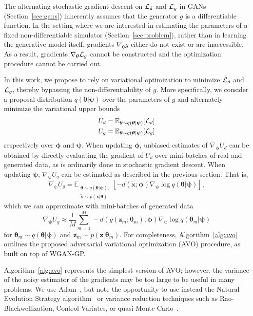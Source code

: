 \documentclass[twocolumn,superscriptaddress,aps]{revtex4-1}
\newcommand{\bftheta}{{\bm \theta}}
\newcommand{\bfpsi}{{\bm \psi}}
\newcommand{\bfphi}{{\bm \phi}}
\newcommand{\bfx}{\mathbf{x}}
\newcommand{\bfz}{\mathbf{z}}
\theoremstyle{plain}
\begin{document}
The alternating stochastic gradient descent on ${\cal L}_d$ and ${\cal L}_g$ in
GANs (Section~\ref{sec:gans}) inherently assumes that the generator $g$ is a differentiable function. In
the setting where we are interested in estimating the parameters of a
fixed non-differentiable simulator (Section~\ref{sec:problem}),
rather than in learning the generative model itself,
gradients $\nabla_\bftheta g$ either do not exist or are inaccessible. As a
result, gradients $\nabla_\bftheta {\cal L}_g$ cannot be constructed and the
optimization procedure cannot be carried out.

In this work, we propose to rely on variational optimization to minimize ${\cal
L}_d$ and ${\cal L}_g$, thereby bypassing the non-differentiability of $g$. More
specifically, we consider a proposal distribution $q(\bftheta|\bfpsi)$ over the
parameters of $g$ and alternately minimize the variational upper bounds
\begin{align}
    U_d &= \mathbb{E}_{\bftheta \sim q(\bftheta|\bfpsi)} [ {\cal L}_d ] \label{eqn:vo-ud} \\
    U_g &= \mathbb{E}_{\bftheta \sim q(\bftheta|\bfpsi)} [ {\cal L}_g ] \label{eqn:vo-ug}
\end{align} respectively over $\bfphi$ and $\bfpsi$.
When updating
$\bfphi$, unbiased estimates of $\nabla_\bfphi U_d$ can be obtained by
directly evaluating the gradient of $U_d$ over mini-batches of real and
generated data, as is ordinarily done in stochastic gradient descent. When updating
$\bfpsi$, $\nabla_\bfpsi U_g$ can be estimated as described in the previous section.
That is,
\begin{equation}\label{eqn:grad-ug-approx}
   \nabla_\bfpsi U_g = \mathbb{E}_{\substack{\bftheta \sim q(\bftheta|\bfpsi), \\ \tilde{\bfx} \sim p(\bfx | \bftheta)}}  [-d( \tilde{\bfx} ;\bfphi) \nabla_\bfpsi \log q(\bftheta|\bfpsi)],
\end{equation}
which we can approximate with mini-batches of
generated data
\begin{equation}
    \nabla_\bfpsi U_g \approx \frac{1}{M} \sum_{m=1}^M -d(g(\bfz_m; \bftheta_m); \bfphi) \nabla_\bfpsi \log q(\bftheta_m|\bfpsi)
\end{equation}
for $\bftheta_m \sim q(\bftheta|\bfpsi)$ and $\bfz_m \sim p(\bfz|\bftheta_m)$.
For completeness, Algorithm~\ref{alg:avo} outlines the proposed adversarial variational
optimization (AVO) procedure, as built on top of WGAN-GP.

Algorithm~\ref{alg:avo} represents the simplest version of AVO; however, the
variance of the noisy estimator of the gradients may be too large to be useful in many problems.
We use Adam~\cite{2014arXiv1412.6980K}, but note the opportunity to use instead the Natural Evolution Strategy
algorithm~\citep{2011arXiv1106.4487W} or variance reduction techniques
such as Rao-Blackwellization,
Control Variates, or quasi-Monte Carlo~\citep{ranganath2014black, tran2017variational}.
\end{document}
